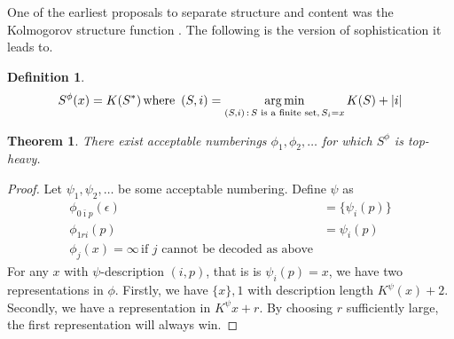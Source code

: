 \documentclass{article}
\newtheorem{theorem}{Theorem}
\newtheorem{definition}{Definition}
\newcommand{\tn}[1]{\textnormal{#1}}
\newcommand{\argmin}{\mathop{\arg\min}}
\begin{document}
One of the earliest proposals to separate structure and content was the Kolmogorov structure function \cite{TODO}. The following is the version of sophistication it leads to. 
\begin{definition}
\[
	S^\phi(x) = K(S^*) \,\tn{where }\, (S, i) = \argmin_{(S, i)\,:\,\text{$S$ is a finite set},\,S_i = x} K(S) + |i|
\]
\end{definition}

\begin{theorem}
There exist acceptable numberings $\phi_1, \phi_2, \ldots$ for which $S^\phi$ is top-heavy.
\end{theorem}
\begin{proof}
Let $\psi_1, \psi_2, \ldots$ be some acceptable numbering. Define $\psi$ as 
\begin{align*}
\phi_{0\bar\imath p}(\epsilon) &= \{\psi_i(p)\} \\
\phi_{1ri}(p) &= \psi_i(p)\\ 
\phi_j(x) = \infty \,\text{if $j$ cannot be decoded as above}
\end{align*}
For any $x$ with $\psi$-description $(i, p)$, that is is $\psi_i(p) = x$, we have two representations in $\phi$. Firstly, we have $\{x\}, 1$ with description length $K^\psi(x) + 2$. Secondly, we have a representation in $K^\psi{x} + r$. By choosing $r$ sufficiently large, the first representation will always win.
\end{proof}




\end{document}
